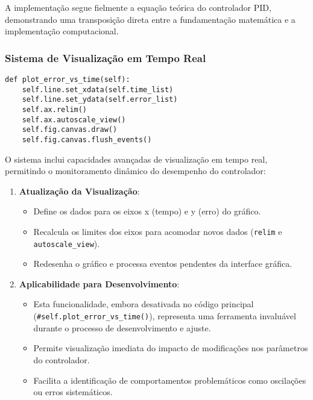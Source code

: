 A implementação segue fielmente a equação teórica do controlador PID,
demonstrando uma transposição direta entre a fundamentação matemática e a
implementação computacional.

\subsubsection{Sistema de Visualização em Tempo Real}

\begin{verbatim}
def plot_error_vs_time(self):
    self.line.set_xdata(self.time_list)
    self.line.set_ydata(self.error_list)
    self.ax.relim()
    self.ax.autoscale_view()
    self.fig.canvas.draw()
    self.fig.canvas.flush_events()
\end{verbatim}

O sistema inclui capacidades avançadas de visualização em tempo real,
permitindo o monitoramento dinâmico do desempenho do controlador:

\begin{enumerate}
    \item \textbf{Atualização da Visualização}:
          \begin{itemize}
              \item Define os dados para os eixos x (tempo) e y (erro) do gráfico.
              \item Recalcula os limites dos eixos para acomodar novos dados (\texttt{relim} e
                    \texttt{autoscale\_view}).
              \item Redesenha o gráfico e processa eventos pendentes da interface gráfica.
          \end{itemize}

    \item \textbf{Aplicabilidade para Desenvolvimento}:
          \begin{itemize}
              \item Esta funcionalidade, embora desativada no código principal
                    (\texttt{\#self.plot\_error\_vs\_time()}), representa uma ferramenta invaluável
                    durante o processo de desenvolvimento e ajuste.
              \item Permite visualização imediata do impacto de modificações nos parâmetros do
                    controlador.
              \item Facilita a identificação de comportamentos problemáticos como oscilações ou
                    erros sistemáticos.
          \end{itemize}
\end{enumerate}

